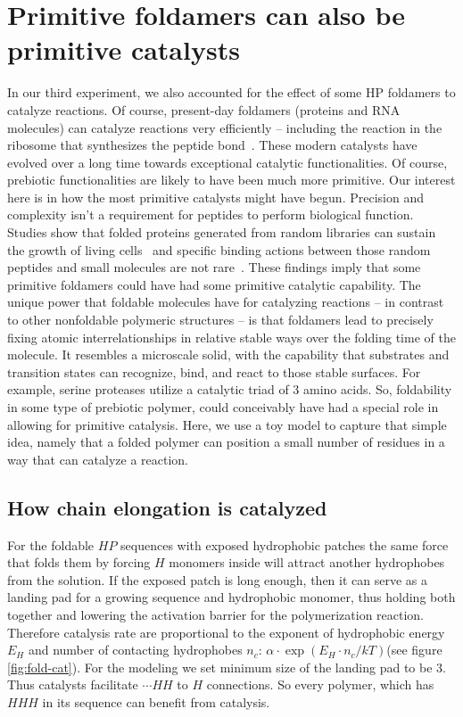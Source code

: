 \documentclass[journal=jacsat,manuscript=article,layout=twocolumn]{achemso}
\newcommand*{\ga}{\alpha}
\begin{document}
\section{Primitive foldamers can also be primitive catalysts}

 In our third experiment, we also accounted for the effect of some HP foldamers to catalyze 
reactions.  Of course, present-day foldamers (proteins and RNA molecules) can catalyze reactions very 
efficiently -- including the reaction in the ribosome that synthesizes the peptide 
bond~\cite{Stachelhaus1998}. These modern catalysts have evolved over a long time towards 
exceptional catalytic functionalities.  Of course, prebiotic functionalities are likely to have 
been 
much more primitive.  Our interest here is in how the most primitive catalysts might have begun.  
Precision and complexity isn't a requirement for peptides to perform biological function. Studies 
show that folded proteins generated from random libraries can sustain the growth of living 
cells~\cite{Fisher2011} and specific binding actions between those random peptides and small molecules are not 
rare~\cite{Cherny2012}. These findings imply that some primitive foldamers could have had some 
primitive catalytic capability.  The unique power that foldable molecules have for catalyzing reactions -- in contrast to 
other nonfoldable polymeric structures -- is that foldamers lead to precisely fixing atomic interrelationships in relative stable ways over the folding time of the molecule.  It resembles a microscale solid, with the capability that substrates and transition 
states can recognize, bind, and react to those stable surfaces. For example, serine proteases utilize a catalytic triad 
of 3 amino acids.  So, foldability in some type of prebiotic polymer, could conceivably have had a 
special role in allowing for primitive catalysis.  Here, we use a toy model to capture that simple 
idea, namely that a folded polymer can position a small number of residues in a way that can 
catalyze a reaction. 


\subsection{How chain elongation is catalyzed}

For  the foldable $HP$ sequences with exposed hydrophobic patches the same force that folds them 
by forcing $H$ monomers inside will attract another hydrophobes from the solution. 
If the exposed patch is long enough, then it can serve as a landing pad for a growing sequence and 
hydrophobic monomer, thus holding both together and lowering the activation barrier for the 
polymerization reaction. Therefore catalysis rate are proportional to the exponent of hydrophobic 
energy $E_H$ and number of contacting 
hydrophobes $n_c$: $\ga\cdot\exp(E_{H}\cdot n_{c}/kT)$(see figure \ref{fig:fold-cat}).  
For the modeling we set minimum size of the landing pad to be 3. Thus catalysts facilitate $\cdots 
HH$ to 
$H$ connections. So every polymer, which has $HHH$ in its sequence can benefit from catalysis. 
\end{document}

